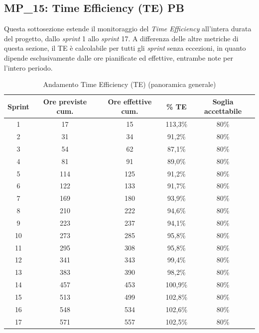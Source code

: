 \documentclass[12pt, a4paper]{article}
\begin{document}
\subsection{MP\_15: Time Efficiency (TE) PB}
Questa sottosezione estende il monitoraggio del \textit{Time Efficiency} all'intera durata del progetto, dallo \textit{sprint} 1 allo \textit{sprint} 17. A differenza delle altre metriche di questa sezione, il TE è calcolabile per tutti gli \textit{sprint} senza eccezioni, in quanto dipende esclusivamente dalle ore pianificate ed effettive, entrambe note per l'intero periodo.

\begin{table}[htbp]
    \centering
    \renewcommand{\arraystretch}{1.3}
    \begin{tabular}{|c|c|c|c|c|}
        \hline
        \textbf{Sprint} & \textbf{Ore previste cum.} & \textbf{Ore effettive cum.} & \textbf{\% TE} & \textbf{Soglia accettabile} \\ \hline
        1  & 17  & 15  & 113,3\% & 80\% \\ \hline
        2  & 31  & 34  & 91,2\%  & 80\% \\ \hline
        3  & 54  & 62  & 87,1\%  & 80\% \\ \hline
        4  & 81  & 91  & 89,0\%  & 80\% \\ \hline
        5  & 114 & 125 & 91,2\%  & 80\% \\ \hline
        6  & 122 & 133 & 91,7\%  & 80\% \\ \hline
        7  & 169 & 180 & 93,9\%  & 80\% \\ \hline
        8  & 210 & 222 & 94,6\%  & 80\% \\ \hline
        9  & 223 & 237 & 94,1\%  & 80\% \\ \hline
        10 & 273 & 285 & 95,8\%  & 80\% \\ \hline
        11 & 295 & 308 & 95,8\%  & 80\% \\ \hline
        12 & 341 & 343 & 99,4\%  & 80\% \\ \hline
        13 & 383 & 390 & 98,2\%  & 80\% \\ \hline
        14 & 457 & 453 & 100,9\%  & 80\% \\ \hline
        15 & 513 & 499 & 102,8\%  & 80\% \\ \hline
        16 & 548 & 534 & 102,6\%  & 80\% \\ \hline
        17 & 571 & 557 & 102,5\%  & 80\% \\ \hline
    \end{tabular}
    \caption{Andamento Time Efficiency (TE) (panoramica generale)}
    \label{tab:ore_te_sprint_pb}
\end{table}
\end{document}
